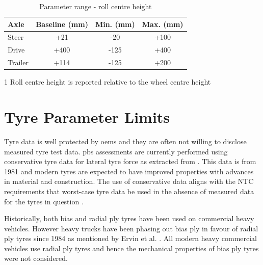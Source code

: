 \begin{table}[H]
	\centering\footnotesize
	\begin{threeparttable}

		\begin{tabulary}{\textwidth}{lccc}
			\toprule
			\textbf{Axle} & \textbf{Baseline (mm)} & \textbf{Min. (mm)} & \textbf{Max. (mm)} \\
			\midrule
             Steer & +21    & -20   & +100 \\
             Drive & +400   & -125  & +400 \\
             Trailer & +114   & -125  & +200 \\
			\bottomrule
		\end{tabulary}

		\caption{Parameter range - roll centre height}
		\label{table:parameter-range-roll-centre-height}

		\begin{tablenotes}
			\item[1] Roll centre height is reported relative to the wheel centre height
		\end{tablenotes}

	\end{threeparttable}
\end{table}

\section{Tyre Parameter Limits}\label{section:pr-tyre-properties}

Tyre data is well protected by \glspl{oem} and they are often not willing to disclose measured tyre test data. \gls{pbs} assessments are currently performed using conservative tyre data for lateral tyre force as extracted from \cite{Fancher1981}. This data is from 1981 and modern tyres are expected to have improved properties with advances in material and construction. The use of conservative data aligns with the NTC requirements that worst-case tyre data be used in the absence of measured data for the tyres in question \cite{NationalTransportCommission2008}.

Historically, both bias and radial ply tyres have been used on commercial heavy vehicles. However heavy trucks have been phasing out bias ply in favour of radial ply tyres since 1984 as mentioned by Ervin et al. \cite{Ervin1986}. All modern heavy commercial vehicles use radial ply tyres and hence the mechanical properties of bias ply tyres were not considered.

